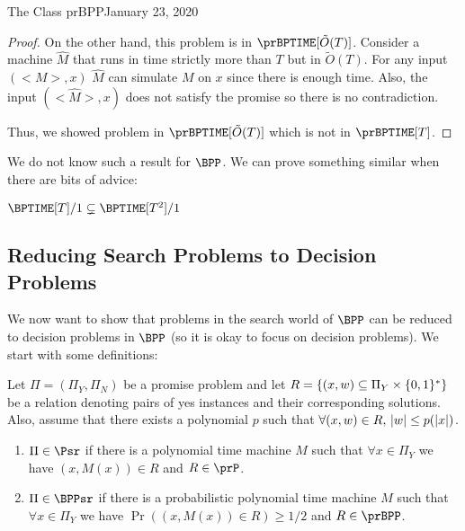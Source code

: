 \begin{lecture}{1}{The Class prBPP}{January 23, 2020}
\begin{proof}
	On the other hand, this problem is in $\prBPTIME[\tilde{O}(T)]$. Consider a machine $\hat{M}$ that runs in time strictly more than $T$ but in $\tilde{O}(T)$. For any input $(<M>,x)$ $\hat{M}$ can simulate $M$ on $x$ since there is enough time. Also, the input $(<\hat{M}>,x)$ does not satisfy the promise so there is no contradiction. 
	
	Thus, we showed problem in $\prBPTIME[\tilde{O}(T)]$ which is not in $\prBPTIME[T]$.
	
\end{proof}

We do not know such a result for $\BPP$. We can prove something similar when there are bits of advice:

\begin{proposition}
	$ \BPTIME[T]/1  \subsetneq \BPTIME[T^2]/1$ 
\end{proposition}




\subsection{Reducing Search Problems to Decision Problems}

We now want to show that problems in the search world of $\BPP$ can be reduced to decision problems in $\BPP$ (so it is okay to focus on decision problems). We start with some definitions:

\begin{definition}
	Let $\Pi = (\Pi_Y,\Pi_N)$ be a promise problem and let $R=\{ (x,w) \subseteq \Pi_Y \times \{0,1\}^* \}$ be a relation denoting pairs of yes instances and their corresponding solutions. Also, assume that there exists a polynomial $p$ such that $\forall (x,w) \in R, \, \lvert w\rvert \leq p(\lvert x\rvert)$.
	
	\begin{enumerate}
		\item $\Pi \in \Psr$ if there is a polynomial time machine $M$ such that $\forall x \in \Pi_Y$ we have $(x, M(x)) \in R$ and $R \in \prP$.
		\item $\Pi \in \BPPsr$ if there is a probabilistic polynomial time machine $M$ such that $\forall x \in \Pi_Y$ we have $\Pr( (x, M(x)) \in R) \geq 1/2$ and $R \in \prBPP$.		
	\end{enumerate}
\end{definition}


\end{lecture}
